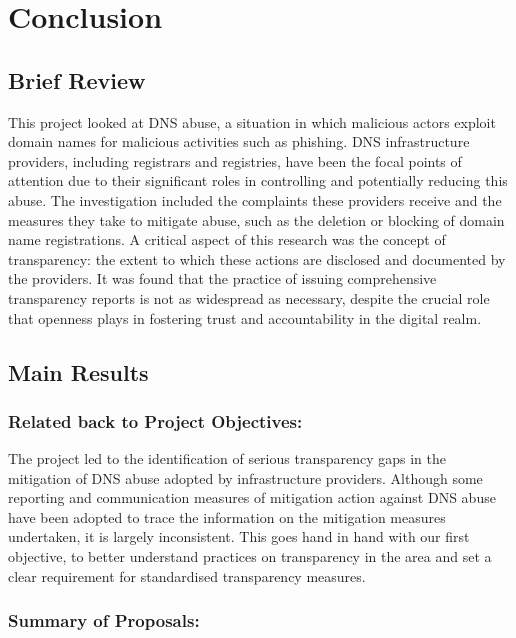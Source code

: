\chapter{Conclusion}

\section{Brief Review}

This project looked at DNS abuse, a situation in which malicious actors exploit domain names for malicious activities such as phishing. DNS infrastructure providers, including registrars and registries, have been the focal points of attention due to their significant roles in controlling and potentially reducing this abuse. The investigation included the complaints these providers receive and the measures they take to mitigate abuse, such as the deletion or blocking of domain name registrations. A critical aspect of this research was the concept of transparency: the extent to which these actions are disclosed and documented by the providers. It was found that the practice of issuing comprehensive transparency reports is not as widespread as necessary, despite the crucial role that openness plays in fostering trust and accountability in the digital realm. 


\section{Main Results}

\subsection{Related back to Project Objectives:}

The project led to the identification of serious transparency gaps in the mitigation of DNS abuse adopted by infrastructure providers. Although some reporting and communication measures of mitigation action against DNS abuse have been adopted to trace the information on the mitigation measures undertaken, it is largely inconsistent. This goes hand in hand with our first objective, to better understand practices on transparency in the area and set a clear requirement for standardised transparency measures.

\subsection{Summary of Proposals:}

